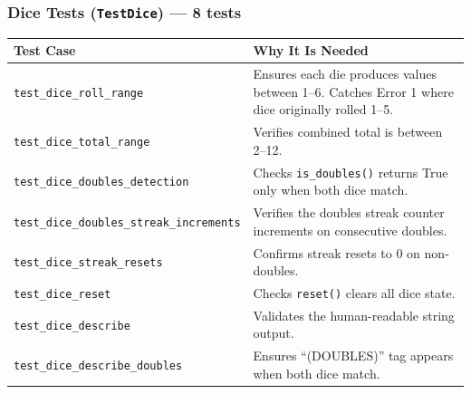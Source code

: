 \documentclass[12pt,a4paper]{article}
\begin{document}
\subsubsection{Dice Tests (\texttt{TestDice}) --- 8 tests}
\begin{longtable}{p{5cm} p{7cm}}
\toprule
\textbf{Test Case} & \textbf{Why It Is Needed} \\
\midrule
\texttt{test\_dice\_roll\_range} & Ensures each die produces values between 1--6. Catches Error 1 where dice originally rolled 1--5. \\
\texttt{test\_dice\_total\_range} & Verifies combined total is between 2--12. \\
\texttt{test\_dice\_doubles\_detection} & Checks \texttt{is\_doubles()} returns True only when both dice match. \\
\texttt{test\_dice\_doubles\_streak\_increments} & Verifies the doubles streak counter increments on consecutive doubles. \\
\texttt{test\_dice\_streak\_resets} & Confirms streak resets to 0 on non-doubles. \\
\texttt{test\_dice\_reset} & Checks \texttt{reset()} clears all dice state. \\
\texttt{test\_dice\_describe} & Validates the human-readable string output. \\
\texttt{test\_dice\_describe\_doubles} & Ensures ``(DOUBLES)'' tag appears when both dice match. \\
\bottomrule
\end{longtable}
\end{document}
